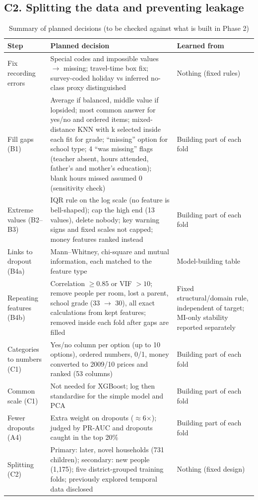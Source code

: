 \documentclass[conference,a4paper]{IEEEtran}
\renewcommand{\arraystretch}{1.12}
\begin{document}
\subsection*{C2. Splitting the data and preventing leakage}
\begin{table}[!t]
\centering
\caption{Summary of planned decisions (to be checked against what is built in Phase 2)}
\label{tab:summary}
\footnotesize
\renewcommand{\arraystretch}{1.0}
\begin{tabularx}{\textwidth}{P{3.4cm} L P{4.6cm}}
\toprule
Step & Planned decision & Learned from \\
\midrule
Fix recording errors & Special codes and impossible values $\rightarrow$ missing; travel-time box fix; survey-coded holiday vs inferred no-class proxy distinguished & Nothing (fixed rules) \\
Fill gaps (B1) & Average if balanced, middle value if lopsided; most common answer for yes/no and ordered items; mixed-distance KNN with k selected inside each fit for grade; ``missing'' option for school type; 4 ``was missing'' flags (teacher absent, hours attended, father's and mother's education); blank hours missed assumed 0 (sensitivity check) & Building part of each fold \\
Extreme values (B2--B3) & IQR rule on the log scale (no feature is bell-shaped); cap the high end (13 values), delete nobody; key warning signs and fixed scales not capped; money features ranked instead & Building part of each fold \\
Links to dropout (B4a) & Mann--Whitney, chi-square and mutual information, each matched to the feature type & Model-building table \\
Repeating features (B4b) & Correlation $\ge0.85$ or VIF $>10$; remove people per room, lost a parent, school grade (33 $\rightarrow$ 30), all exact calculations from kept features; removed inside each fold after gaps are filled & Fixed structural/domain rule, independent of target; MI-only stability reported separately \\
Categories to numbers (C1) & Yes/no column per option (up to 10 options), ordered numbers, 0/1, money converted to 2009/10 prices and ranked (53 columns) & Building part of each fold \\
Common scale (C1) & Not needed for XGBoost; log then standardise for the simple model and PCA & Building part of each fold \\
Fewer dropouts (A4) & Extra weight on dropouts ($\approx$6$\times$); judged by PR-AUC and dropouts caught in the top 20\% & Building part of each fold \\
Splitting (C2) & Primary: later, novel households (731 children); secondary: new people (1,175); five district-grouped training folds; previously explored temporal data disclosed & Nothing (fixed design) \\
\bottomrule
\end{tabularx}
\end{table}
\end{document}
